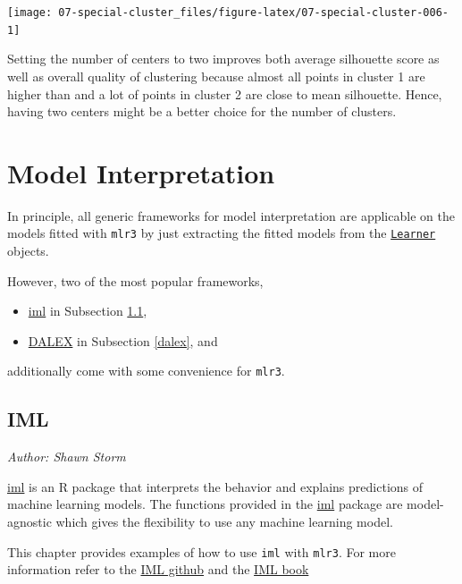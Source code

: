 \documentclass[
]{scrbook}
\providecommand{\tightlist}{%
  \setlength{\itemsep}{0pt}\setlength{\parskip}{0pt}}
\begin{document}
\begin{center}\texttt{[image: 07-special-cluster\_files/figure-latex/07-special-cluster-006-1]} \end{center}

Setting the number of centers to two improves both average silhouette score as well as overall quality of clustering because almost all points in cluster 1 are higher than and a lot of points in cluster 2 are close to mean silhouette.
Hence, having two centers might be a better choice for the number of clusters.

\hypertarget{interpretation}{%
\chapter{Model Interpretation}\label{interpretation}}

In principle, all generic frameworks for model interpretation are applicable on the models fitted with \texttt{mlr3} by just extracting the fitted models from the \href{https://mlr3.mlr-org.com/reference/Learner.html}{\texttt{Learner}} objects.

However, two of the most popular frameworks,

\begin{itemize}
\tightlist
\item
  \href{https://cran.r-project.org/package=iml}{iml} in Subsection \ref{iml},
\item
  \href{https://cran.r-project.org/package=DALEX}{DALEX} in Subsection \ref{dalex}, and
\end{itemize}

additionally come with some convenience for \texttt{mlr3}.

\hypertarget{iml}{%
\section{IML}\label{iml}}

\emph{Author: Shawn Storm}

\href{https://cran.r-project.org/package=iml}{iml} is an R package that interprets the behavior and explains predictions of machine learning models. The functions provided in the \href{https://cran.r-project.org/package=iml}{iml} package are model-agnostic which gives the flexibility to use any machine learning model.

This chapter provides examples of how to use \texttt{iml} with \texttt{mlr3}. For more information refer to the \href{https://github.com/christophM/iml}{IML github} and the \href{https://christophm.github.io/interpretable-ml-book/}{IML book}
\end{document}
